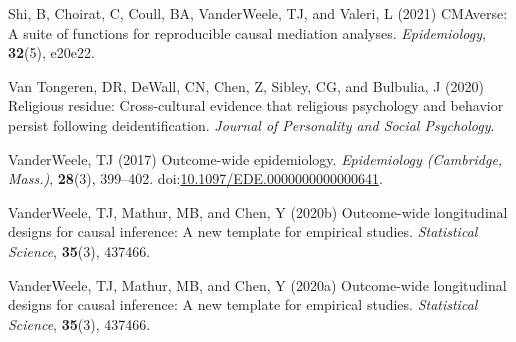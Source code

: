 \documentclass[
  singlecolumn]{article}
\newlength{\cslhangindent}
\newlength{\cslentryspacingunit} %
\newenvironment{CSLReferences}[2] %
 {%
  \setlength{\parindent}{0pt}
  \ifodd #1
  \let\oldpar\par
  \def\par{\hangindent=\cslhangindent\oldpar}
  \fi
  \setlength{\parskip}{#2\cslentryspacingunit}
 }%
 {}
\begin{document}
\begin{CSLReferences}{1}{0}
\leavevmode{}%
Shi, B, Choirat, C, Coull, BA, VanderWeele, TJ, and Valeri, L (2021)
CMAverse: A suite of functions for reproducible causal mediation
analyses. \emph{Epidemiology}, \textbf{32}(5), e20e22.

\leavevmode{}%
Van Tongeren, DR, DeWall, CN, Chen, Z, Sibley, CG, and Bulbulia, J
(2020) Religious residue: Cross-cultural evidence that religious
psychology and behavior persist following deidentification.
\emph{Journal of Personality and Social Psychology}.

\leavevmode{}%
VanderWeele, TJ (2017) Outcome-wide epidemiology. \emph{Epidemiology
(Cambridge, Mass.)}, \textbf{28}(3), 399--402.
doi:\href{https://doi.org/10.1097/EDE.0000000000000641}{10.1097/EDE.0000000000000641}.

\leavevmode{}%
VanderWeele, TJ, Mathur, MB, and Chen, Y (2020b) Outcome-wide
longitudinal designs for causal inference: A new template for empirical
studies. \emph{Statistical Science}, \textbf{35}(3), 437466.

\leavevmode{}%
VanderWeele, TJ, Mathur, MB, and Chen, Y (2020a) Outcome-wide
longitudinal designs for causal inference: A new template for empirical
studies. \emph{Statistical Science}, \textbf{35}(3), 437466.

\end{CSLReferences}
\end{document}
